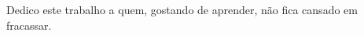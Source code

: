 

\begin{dedicatoria}
   \vspace*{\fill}
	{
		\noindent\hspace{.5\textwidth}
		{\begin{minipage}{.5\textwidth}
				\begin{flushleft}
					Dedico este trabalho a quem, gostando de aprender, não fica cansado em fracassar.
				\end{flushleft}
		\end{minipage}}
	\vspace*{3cm}
	}

\end{dedicatoria}
